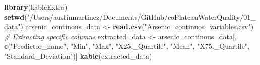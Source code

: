 \documentclass[
]{article}
\newenvironment{Shaded}{\begin{snugshade}}{\end{snugshade}}
\newcommand{\CommentTok}[1]{\textcolor[rgb]{0.56,0.35,0.01}{\textit{#1}}}
\newcommand{\FunctionTok}[1]{\textcolor[rgb]{0.13,0.29,0.53}{\textbf{#1}}}
\newcommand{\NormalTok}[1]{#1}
\newcommand{\OtherTok}[1]{\textcolor[rgb]{0.56,0.35,0.01}{#1}}
\newcommand{\StringTok}[1]{\textcolor[rgb]{0.31,0.60,0.02}{#1}}
\begin{document}
\begin{Shaded}
\begin{Highlighting}[]
\FunctionTok{library}\NormalTok{(kableExtra)}
\FunctionTok{setwd}\NormalTok{(}\StringTok{"/Users/austinmartinez/Documents/GitHub/coPlateauWaterQuality/01\_data"}\NormalTok{)}
\NormalTok{arsenic\_continous\_data }\OtherTok{\textless{}{-}} \FunctionTok{read.csv}\NormalTok{(}\StringTok{"Arsenic\_continuos\_variables.csv"}\NormalTok{)}
\CommentTok{\# Extracting specific columns}
\NormalTok{extracted\_data }\OtherTok{\textless{}{-}}\NormalTok{ arsenic\_continous\_data[, }\FunctionTok{c}\NormalTok{(}\StringTok{"Predictor\_name"}\NormalTok{, }\StringTok{"Min"}\NormalTok{, }\StringTok{"Max"}\NormalTok{, }\StringTok{"X25.\_Quartile"}\NormalTok{, }\StringTok{"Mean"}\NormalTok{, }\StringTok{"X75.\_Quartile"}\NormalTok{,}
                                  \StringTok{"Standard\_Deviation"}\NormalTok{)]}
\FunctionTok{kable}\NormalTok{(extracted\_data)}
\end{Highlighting}
\end{Shaded}
\end{document}

